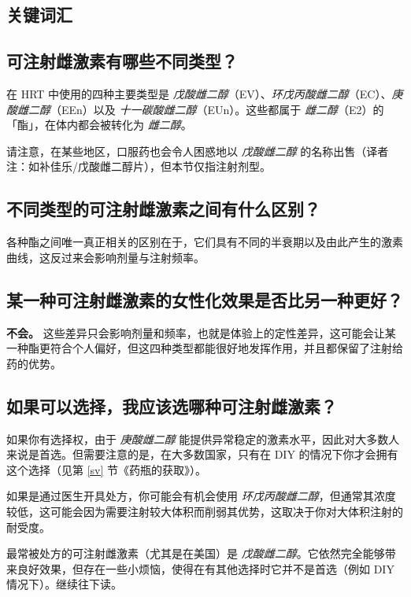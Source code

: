 \documentclass{article}
\begin{document}
\subsection*{关键词汇}

\subsection{可注射雌激素有哪些不同类型？}

在 HRT 中使用的四种主要类型是 \textit{戊酸雌二醇}（EV）、\textit{环戊丙酸雌二醇}（EC）、\textit{庚酸雌二醇}（EEn）以及 \textit{十一碳酸雌二醇}（EUn）。这些都属于 \textit{雌二醇}（E2）的「酯」，在体内都会被转化为 \textit{雌二醇}。

请注意，在某些地区，口服药也会令人困惑地以 \textit{戊酸雌二醇} 的名称出售（译者注：如补佳乐/戊酸雌二醇片），但本节仅指注射剂型。

\subsection{不同类型的可注射雌激素之间有什么区别？}

各种酯之间唯一真正相关的区别在于，它们具有不同的半衰期以及由此产生的激素曲线，这反过来会影响剂量与注射频率。

\subsection{某一种可注射雌激素的女性化效果是否比另一种更好？}

\textbf{不会。} 这些差异只会影响剂量和频率，也就是体验上的定性差异，这可能会让某一种酯更符合个人偏好，但这四种类型都能很好地发挥作用，并且都保留了注射给药的优势。

\subsection{如果可以选择，我应该选哪种可注射雌激素？}

如果你有选择权，由于 \textit{庚酸雌二醇} 能提供异常稳定的激素水平，因此对大多数人来说是首选。但需要注意的是，在大多数国家，只有在 DIY 的情况下你才会拥有这个选择（见第 \ref{sv} 节《药瓶的获取》）。

如果是通过医生开具处方，你可能会有机会使用 \textit{环戊丙酸雌二醇}，但通常其浓度较低，这可能会因为需要注射较大体积而削弱其优势，这取决于你对大体积注射的耐受度。

最常被处方的可注射雌激素（尤其是在美国）是 \textit{戊酸雌二醇}。它依然完全能够带来良好效果，但存在一些小烦恼，使得在有其他选择时它并不是首选（例如 DIY 情况下）。继续往下读。
\end{document}
